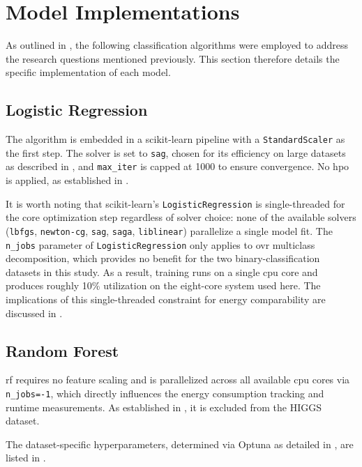 \section{Model Implementations}
\label{implementation_models}

As outlined in , the following classification algorithms were employed to address the research questions mentioned previously. This section therefore details the specific implementation of each model.

\subsection{Logistic Regression}
\label{implementation_lr}

The algorithm is embedded in a scikit-learn pipeline with a \texttt{StandardScaler} as the first step. The solver is set to \texttt{sag}, chosen for its efficiency on large datasets as described in , and \texttt{max\_iter} is capped at 1000 to ensure convergence. No \gls{hpo} is applied, as established in .

It is worth noting that scikit-learn's \texttt{LogisticRegression} is single-threaded for the core optimization step regardless of solver choice: none of the available solvers (\texttt{lbfgs}, \texttt{newton-cg}, \texttt{sag}, \texttt{saga}, \texttt{liblinear}) parallelize a single model fit. The \texttt{n\_jobs} parameter of \texttt{LogisticRegression} only applies to \gls{ovr} multiclass decomposition, which provides no benefit for the two binary-classification datasets in this study. As a result, training runs on a single \gls{cpu} core and produces roughly 10\% utilization on the eight-core system used here. The implications of this single-threaded constraint for energy comparability are discussed in .

\subsection{Random Forest}
\label{implementation_rf}

\gls{rf} requires no feature scaling and is parallelized across all available \gls{cpu} cores via \texttt{n\_jobs=-1}, which directly influences the energy consumption tracking and runtime measurements. As established in , it is excluded from the HIGGS dataset.

The dataset-specific hyperparameters, determined via Optuna as detailed in , are listed in .

